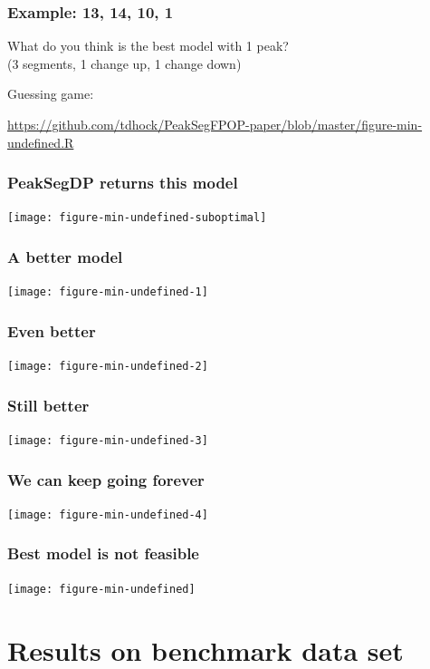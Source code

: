 \documentclass{beamer}
\begin{document}
\begin{frame}
  \frametitle{Example: 13, 14, 10, 1}
  What do you think is the best model with 1 peak?\\
  (3 segments, 1 change up, 1 change down)
  
  \vskip 1cm

  Guessing game:

  \url{https://github.com/tdhock/PeakSegFPOP-paper/blob/master/figure-min-undefined.R} 
\end{frame}

\begin{frame}
  \frametitle{PeakSegDP returns this model}
  \texttt{[image: figure-min-undefined-suboptimal]}
\end{frame}

\begin{frame}
  \frametitle{A better model}
  \texttt{[image: figure-min-undefined-1]}
\end{frame}

\begin{frame}
  \frametitle{Even better}
  \texttt{[image: figure-min-undefined-2]}
\end{frame}

\begin{frame}
  \frametitle{Still better}
  \texttt{[image: figure-min-undefined-3]}
\end{frame}

\begin{frame}
  \frametitle{We can keep going forever}
  \texttt{[image: figure-min-undefined-4]}
\end{frame}

\begin{frame}
  \frametitle{Best model is not feasible}
  \texttt{[image: figure-min-undefined]}
\end{frame}

\section{Results on benchmark data set}
\end{document}
